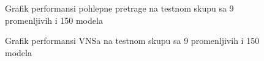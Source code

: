 \documentclass[12pt,oneside]{memoir}
\begin{document}
\vspace{2cm}

\begin{figure}[H]
    \centering
    \hfill
    \caption{Grafik performansi pohlepne pretrage na testnom skupu sa 9 promenljivih i 150 modela}
    \label{fig:test3_greedy_performance}
\end{figure}

\vspace{2cm}

\begin{figure}[H]
    \centering
    \hfill
    \caption{Grafik performansi VNSa na testnom skupu sa 9 promenljivih i 150 modela}
    \label{fig:test3_vns_performance}
\end{figure}
\end{document}
